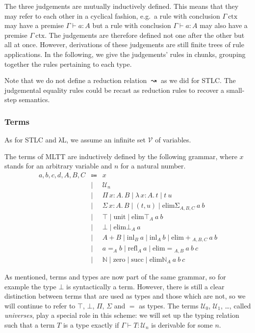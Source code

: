 \documentclass{scrartcl}
\theoremstyle{definition}
\newcommand{\Vars}{\mathcal{V}}
\newcommand{\Lam}[2]{λ\,#1.\, #2}
\newcommand{\PiT}[2]{Π\,#1.\, #2}
\newcommand{\SigT}[2]{Σ\,#1.\, #2}
\newcommand{\unit}{\mathrm{unit}}
\newcommand{\zero}{\mathrm{zero}}
\newcommand{\suc}{\mathrm{succ}}
\newcommand{\elimSig}{\mathrm{elimΣ}}
\newcommand{\elimTop}{\mathrm{elim⊤}}
\newcommand{\elimBot}{\mathrm{elim⊥}}
\newcommand{\elimSum}{\mathrm{elim+}}
\newcommand{\elimId}{\mathrm{elim{=}}}
\newcommand{\elimNat}{\mathrm{elimℕ}}
\newcommand{\ctx}{\mathrm{ctx}}
\newcommand{\Univ}{\mathcal{U}}
\newcommand{\inl}{\ensuremath{\mathrm{inl}}}
\newcommand{\refl}{\mathrm{refl}}
\begin{document}
The three judgements are mutually inductively defined.
This means that they may refer to each other in a cyclical fashion, e.g.\ a rule with conclusion $Γ~\ctx$ may have a premise $Γ ⊢ a : A$ but a rule with conclusion $Γ ⊢ a : A$ may also have a premise $Γ~\ctx$.
The judgements are therefore defined not one after the other but all at once.
However, derivations of these judgements are still finite trees of rule applications.
In the following, we give the judgements' rules in chunks, grouping together the rules pertaining to each type.

Note that we do not define a reduction relation $↝$ as we did for STLC.\@
The judgemental equality rules could be recast as reduction rules to recover a small-step semantics.

\subsubsection{Terms}

As for STLC and λL, we assume an infinite set $\Vars$ of variables.

\begin{definition}[Terms]
  The terms of MLTT are inductively defined by the following grammar, where $x$ stands for an arbitrary variable and $n$ for a natural number.
  \begin{eqnarray*}
    a, b, c, d, A, B, C
    &\Coloneqq& x \\
    &|& \Univ_{n} \\
    &|& \PiT{x : A}{B} \mid \Lam{x : A}{t} \mid t~u \\
    &|& \SigT{x : A}{B} \mid (t, u) \mid \elimSig_{A,B,C}~a~b \\
    &|& ⊤ \mid \unit \mid \elimTop_{A}~a~b \\
    &|& ⊥ \mid \elimBot_{A}~a \\
    &|& A + B \mid \inl_{B}~a \mid \inl_{A}~b \mid \elimSum_{A,B,C}~a~b \\
    &|& a =_{A} b \mid \refl_{A}~a \mid \elimId_{A,B}~a~b~c \\
    &|& ℕ \mid \zero \mid \suc \mid \elimNat_{A}~a~b~c
  \end{eqnarray*}
\end{definition}

As mentioned, terms and types are now part of the same grammar, so for example the type $⊥$ is syntactically a term.
However, there is still a clear distinction between terms that are used as types and those which are not, so we will continue to refer to $⊤$, $⊥$, $Π$, $Σ$ and $=$ as types.
The terms $\Univ_{0}$, $\Univ_{1}$, \dots, called \emph{universes}, play a special role in this scheme: we will set up the typing relation such that a term $T$ is a type exactly if $Γ ⊢ T : \Univ_{n}$ is derivable for some $n$.
\end{document}
